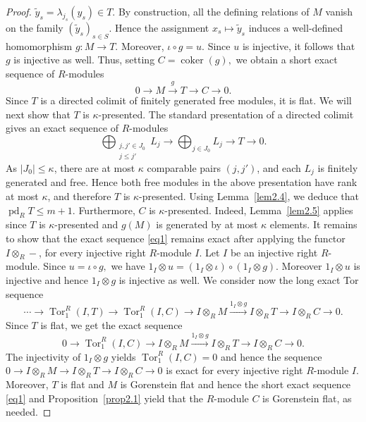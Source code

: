 \documentclass[12pt]{amsart}
\theoremstyle{remark}
\theoremstyle{definition}
\theoremstyle{plain}
\DeclareMathOperator{\pd}{pd}
\DeclareMathOperator{\Tor}{Tor}
\DeclareMathOperator{\coker}{coker}
\begin{document}
\begin{proof}
$
\widetilde y_s=\lambda_{j_s}(y_s)\in T.$
By construction, all the defining relations of $M$ vanish on the
family $(\widetilde y_s)_{s\in S}$. Hence the assignment
$x_s\mapsto \widetilde y_s$
induces a well-defined homomorphism $g:M\rightarrow T.$
Moreover, $\iota \circ g=u.$
Since $u$ is injective, it follows that $g$ is injective as well. Thus, setting
$C=\coker(g),$
we obtain a short exact sequence of $R$-modules
\begin{equation}\label{eq1}
	0\rightarrow M\xrightarrow{\,g\,}T\rightarrow C
\rightarrow 0.
\end{equation}
Since $T$ is a directed colimit of finitely generated free modules, it is flat. We will next show that $T$ is $\kappa$-presented. The standard presentation of a directed colimit gives an exact sequence of $R$-modules
$$\bigoplus_{\substack{j,j'\in J_0\\ j\leq j'}}L_j
\rightarrow
\bigoplus_{j\in J_0}L_j
\rightarrow T\rightarrow 0.$$
As $|J_0|\leq\kappa$, there are at most $\kappa$ comparable pairs
$(j,j')$, and each $L_j$ is finitely generated and free. Hence both free modules in the above presentation have rank at most $\kappa$, and
therefore $T$ is $\kappa$-presented. Using Lemma~\ref{lem2.4}, we deduce that
$\pd_R T\leq m+1.$ Furthermore, $C$ is $\kappa$-presented. Indeed, Lemma~\ref{lem2.5} applies since $T$ is
$\kappa$-presented and $g(M)$ is generated by at most $\kappa$
elements.
It remains to show that the exact sequence \eqref{eq1} remains exact after applying the functor $I\otimes_R -$, for every injective right $R$-module $I$. Let $I$ be an
injective right $R$-module. Since
$u=\iota \circ g,$
we have
$
1_I\otimes u
=
(1_I\otimes\iota)\circ(1_I\otimes g).$
Moreover $1_I\otimes u$ is injective and hence $1_I\otimes g$ is injective as well. We consider now the long exact Tor sequence \begin{equation*} \cdots \rightarrow \Tor_1^R(I,T)\rightarrow \Tor_1^R(I,C)\rightarrow I\otimes_RM\xrightarrow{1_I \otimes g}I\otimes_RT\rightarrow I\otimes_RC\rightarrow 0.\end{equation*} Since $T$ is flat, we get the exact sequence
\begin{equation*}
	0\rightarrow \Tor_1^R(I,C)\rightarrow I\otimes_RM\xrightarrow{1_I \otimes g}I\otimes_RT\rightarrow I\otimes_RC\rightarrow 0.\end{equation*} The injectivity of $1_I \otimes g$ yields $\Tor_1^R(I,C)=0$ and hence the sequence $0\rightarrow I\otimes_RM\rightarrow I\otimes_RT\rightarrow I\otimes_RC\rightarrow 0$ is exact
for every injective right $R$-module $I$.  Moreover, $T$ is flat and $M$ is Gorenstein flat and hence the short exact sequence \eqref{eq1} and Proposition~\ref{prop2.1} yield that the $R$-module $C$ is Gorenstein flat, as needed.


\end{proof}
\end{document}
